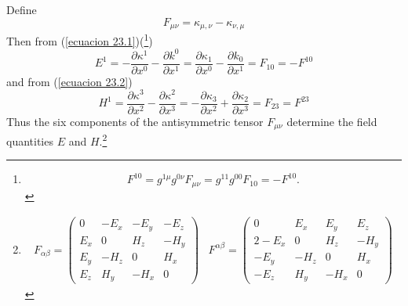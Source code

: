 Define 
\begin{equation}
\label{ecuacion 23.7}
 F_{\mu\nu} = \kappa_{\mu,\nu} - \kappa_{\nu,\mu}
\end{equation}
Then from (\ref{ecuacion 23.1})(\footnote{\[
    F^{10} = g^{1\mu}g^{0\nu} F_{\mu\nu} = g^{11}g^{00} F_{10} = - F^{10}.
\]})
\[
 E^1 = - \frac{\partial \kappa^1}{\partial x^0} - \frac{\partial k^0}{\partial x^1}
     =   \frac{\partial \kappa_1}{\partial x^0} - \frac{\partial k_0}{\partial x^1}
     =   F_{10}
     = - F^{10}
\]
and from (\ref{ecuacion 23.2})
\[
    H^1 =   \frac{\partial \kappa^3}{\partial x^2} - \frac{\partial \kappa^2}{\partial x^3}
        = - \frac{\partial \kappa_3}{\partial x^2} + \frac{\partial \kappa_2}{\partial x^3}
        = F_{23} = F^{23}
\]
Thus the six components of the antisymmetric tensor $F_{\mu\nu}$ determine the field quantities $E$ and $H$.\footnote{
\[
\begin{array}{cc}
F_{\alpha\beta} = 
\left(
    \begin{array}{cccc}
        0    &  -E_x  & -E_y &  -E_z \\
        E_x  &    0   &  H_z &  -H_y \\
        E_y  &  -H_z  &   0  &   H_x \\
        E_z  &   H_y  & -H_x &    0
    \end{array}
\right)
&
F^{\alpha\beta} = 
\left(
    \begin{array}{cccc}
         0    &   E_x  &  E_y &   E_z \\2
        -E_x  &    0   &  H_z &  -H_y \\
        -E_y  &  -H_z  &   0  &   H_x \\
        -E_z  &   H_y  & -H_x &    0
    \end{array}
\right)
\end{array}
\]
}

